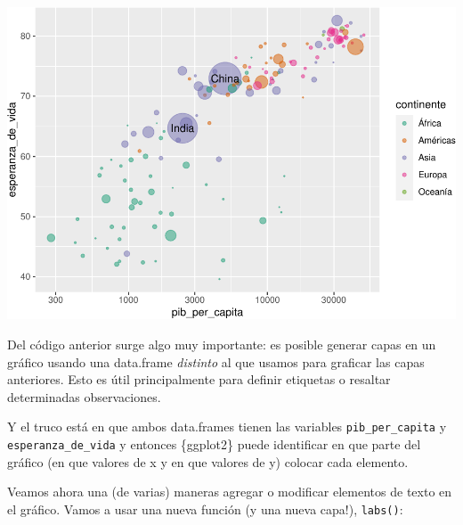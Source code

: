 \documentclass[
  openany]{book}
\begin{document}
\begin{center}\includegraphics[width=1\linewidth]{DT6_files/figure-latex/unnamed-chunk-136-1} \end{center}

Del código anterior surge algo muy importante: es posible generar capas en un gráfico usando una data.frame \emph{distinto} al que usamos para graficar las capas anteriores.
Esto es útil principalmente para definir etiquetas o resaltar determinadas observaciones.

Y el truco está en que ambos data.frames tienen las variables \texttt{pib\_per\_capita} y \texttt{esperanza\_de\_vida} y entonces \{ggplot2\} puede identificar en que parte del gráfico (en que valores de x y en que valores de y) colocar cada elemento.

Veamos ahora una (de varias) maneras agregar o modificar elementos de texto en el gráfico.
Vamos a usar una nueva función (y una nueva capa!), \texttt{labs()}:
\end{document}
